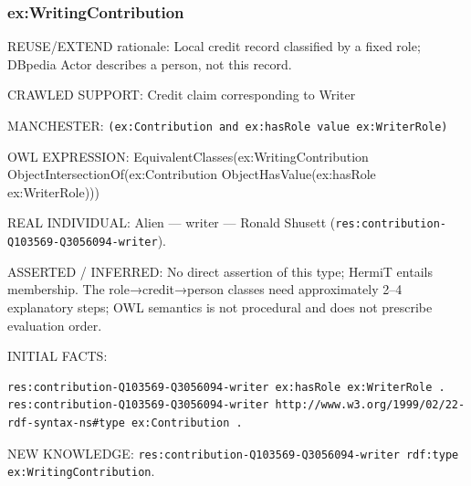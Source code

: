 \documentclass[
  11pt,
]{article}
\begin{document}
\subsubsection{\texorpdfstring{ex:\allowbreak{}\allowbreak{}Writi\allowbreak{}ng\allowbreak{}Contri\allowbreak{}bution}{}}\label{exwritingcontribution}

REUSE/EXTEND rationale: Local credit record classified by a fixed role;
DBpedia Actor describes a person, not this record.

CRAWLED SUPPORT: Credit claim correspo\allowbreak{}nding to Writer

MANCHESTER:
\texttt{(ex:\allowbreak{}\allowbreak{}Cont\allowbreak{}ribution\allowbreak{} and ex:\allowbreak{}has\allowbreak{}Role \allowbreak{}value ex\allowbreak{}:\allowbreak{}\allowbreak{}Writer\allowbreak{}R\allowbreak{}ole)}

OWL EXPRESSION:
Equivale\allowbreak{}nt\allowbreak{}Classe\allowbreak{}s(ex:\allowbreak{}\allowbreak{}Wri\allowbreak{}ting\allowbreak{}Cont\allowbreak{}ribution\allowbreak{}
Object\allowbreak{}In\allowbreak{}tersecti\allowbreak{}on\allowbreak{}Of(ex:\allowbreak{}\allowbreak{}Contribu\allowbreak{}tion
Object\allowbreak{}Ha\allowbreak{}s\allowbreak{}Value(e\allowbreak{}x:\allowbreak{}has\allowbreak{}Rol\allowbreak{}e
ex:\allowbreak{}\allowbreak{}Write\allowbreak{}r\allowbreak{}Role)))\allowbreak{}

REAL INDIVIDUAL: Alien --- writer --- Ronald Shusett
(\texttt{res:\allowbreak{}cont\allowbreak{}ribution\allowbreak{}-\allowbreak{}\allowbreak{}Q103569\allowbreak{}-\allowbreak{}\allowbreak{}Q305609\allowbreak{}4-\allowbreak{}writer\allowbreak{}}).

ASSERTED / INFERRED: No direct assertion of this type; HermiT entails
membership. The role→credit→person classes need
approxim\allowbreak{}ately 2--4 explanatory steps; OWL semantics is not
procedural and does not prescribe evaluation order.

INITIAL FACTS:

\begin{verbatim}
res:contribution-Q103569-Q3056094-writer ex:hasRole ex:WriterRole .
res:contribution-Q103569-Q3056094-writer http://www.w3.org/1999/02/22-rdf-syntax-ns#type ex:Contribution .
\end{verbatim}

NEW KNOWLEDGE:
\texttt{res:\allowbreak{}cont\allowbreak{}ribution\allowbreak{}-\allowbreak{}\allowbreak{}Q103569\allowbreak{}-\allowbreak{}\allowbreak{}Q305609\allowbreak{}4-\allowbreak{}writer\allowbreak{} rdf:\allowbreak{}typ\allowbreak{}e ex:\allowbreak{}\allowbreak{}Wri\allowbreak{}ting\allowbreak{}Cont\allowbreak{}ribution\allowbreak{}}.
\end{document}
